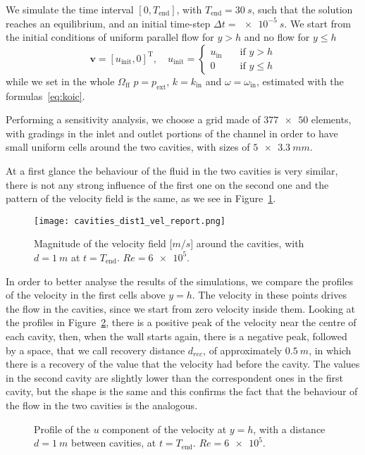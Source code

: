 We simulate the time interval $[0, T_\text{end}]$, with $T_\text{end}=\SI{30}{s}$, such that the solution reaches an equilibrium, and an initial time-step $\Delta t = \SI{e-5}{s}$. We start from the initial 
conditions of uniform parallel flow for $y>h$ and no flow for $y\leq h$
\begin{equation}
	\mathbf{v} = [u_\text{init},0]^\mathrm{T}, \quad u_\text{init} =
	\begin{cases}
	u_\text{in} \quad&\text{if $y>h$}\\
	0 \quad&\text{if $y\leq h$}
	\end{cases}
\end{equation}
while we set in the whole $\Omega_\text{ff}$ $p=p_\text{ext}$, $k=k_\text{in}$ and $\omega=\omega_\text{in}$, estimated with the formulas~\eqref{eq:koic}.

Performing a sensitivity analysis, we choose a grid made of $\num{377x50}$ 
elements, with gradings in the inlet and outlet portions of the channel in order 
to have small uniform cells around the two cavities, with sizes of $\SI{5x3.3}{mm}$.

At a first glance the behaviour of the fluid in the two cavities is very 
similar, there is not any strong influence of the first one on the second one 
and the pattern of the velocity field is the same, as we see in Figure~\ref{fig:veld1}. 
\begin{figure}
	\centering
	\texttt{[image: cavities\_dist1\_vel\_report.png]}
	\caption[Magnitude of the velocity field in the cavities problem]{Magnitude of the velocity field [$\si{m/s}$] around the cavities, with $d=\SI{1}{m}$ at $t=T_\text{end}$. $Re=\num{6e5}$.}
	\label{fig:veld1}
\end{figure}
In order to better analyse the results of the simulations, we compare the 
profiles of the velocity in the first cells above $y=h$. The velocity in these points drives the flow in the cavities, 
since we start from zero velocity inside them. Looking at the profiles in Figure~\ref{fig:velprofile1}, there is a positive 
peak of the velocity near the centre of each cavity, then, when the wall starts 
again, there is a negative peak, followed by a space, that we call recovery 
distance $d_{rec}$, of approximately $\SI{0.5}{m}$, in which there is a recovery 
of the value that the velocity had before the cavity. The values in the second 
cavity are slightly lower than the correspondent ones in the first cavity, but 
the shape is the same and this confirms the fact that the behaviour of the flow 
in the two cavities is the analogous.
\begin{figure}
	\centering
	
	\caption[Profile of the $u$ component of the velocity at $y=h$ in the cavities problem]{Profile of the $u$ component of the velocity at $y=h$, with a distance $d=\SI{1}{m}$ between cavities, at $t=T_\text{end}$. $Re = \num{6e5}$.}
	\label{fig:velprofile1}
\end{figure}

